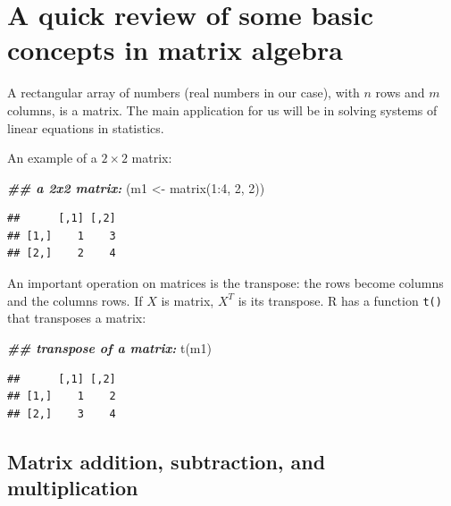 \documentclass[
  12pt,
]{krantz}
\newenvironment{Shaded}{\begin{snugshade}}{\end{snugshade}}
\newcommand{\DecValTok}[1]{\textcolor[rgb]{0.00,0.00,0.81}{#1}}
\newcommand{\DocumentationTok}[1]{\textcolor[rgb]{0.56,0.35,0.01}{\textbf{\textit{#1}}}}
\newcommand{\FunctionTok}[1]{\textcolor[rgb]{0.00,0.00,0.00}{#1}}
\newcommand{\NormalTok}[1]{#1}
\newcommand{\OtherTok}[1]{\textcolor[rgb]{0.56,0.35,0.01}{#1}}
\newcommand{\SpecialCharTok}[1]{\textcolor[rgb]{0.00,0.00,0.00}{#1}}
\theoremstyle{definition}
\theoremstyle{definition}
\theoremstyle{definition}
\theoremstyle{definition}
\theoremstyle{remark}
\begin{document}
\hypertarget{a-quick-review-of-some-basic-concepts-in-matrix-algebra}{%
\section{A quick review of some basic concepts in matrix algebra}\label{a-quick-review-of-some-basic-concepts-in-matrix-algebra}}

A rectangular array of numbers (real numbers in our case), with \(n\) rows and \(m\) columns, is a matrix. The main application for us will be in solving systems of linear equations in statistics.

An example of a \(2\times 2\) matrix:

\begin{Shaded}
\begin{Highlighting}[]
\DocumentationTok{\#\# a 2x2 matrix:}
\NormalTok{(m1 }\OtherTok{\textless{}{-}} \FunctionTok{matrix}\NormalTok{(}\DecValTok{1}\SpecialCharTok{:}\DecValTok{4}\NormalTok{, }\DecValTok{2}\NormalTok{, }\DecValTok{2}\NormalTok{))}
\end{Highlighting}
\end{Shaded}

\begin{verbatim}
##      [,1] [,2]
## [1,]    1    3
## [2,]    2    4
\end{verbatim}

An important operation on matrices is the transpose: the rows become columns and the columns rows. If \(X\) is matrix, \(X^T\) is its transpose. R has a function \texttt{t()} that transposes a matrix:

\begin{Shaded}
\begin{Highlighting}[]
\DocumentationTok{\#\# transpose of a matrix:}
\FunctionTok{t}\NormalTok{(m1)}
\end{Highlighting}
\end{Shaded}

\begin{verbatim}
##      [,1] [,2]
## [1,]    1    2
## [2,]    3    4
\end{verbatim}

\hypertarget{matrix-addition-subtraction-and-multiplication}{%
\subsection{Matrix addition, subtraction, and multiplication}\label{matrix-addition-subtraction-and-multiplication}}
\end{document}
